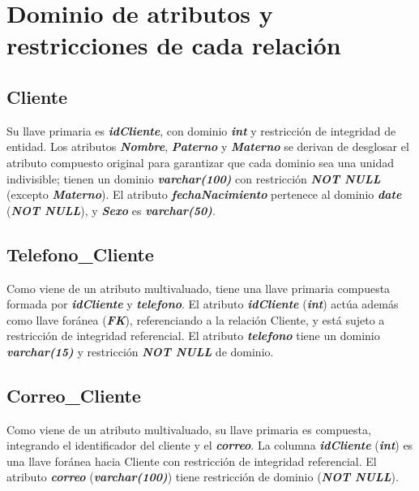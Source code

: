 \documentclass[11pt,letterpaper,spanish]{article}
\begin{document}
\section{Dominio de atributos y restricciones de cada relación}

\subsection{Cliente}
Su llave primaria es \textbf{\textit{idCliente}}, con dominio \textbf{\textit{int}} y restricción de integridad de entidad. Los atributos \textbf{\textit{Nombre}}, \textbf{\textit{Paterno}} y \textbf{\textit{Materno}} se derivan de desglosar el atributo compuesto original para garantizar que cada dominio sea una unidad indivisible; tienen un dominio \textbf{\textit{varchar(100)}} con restricción \textbf{\textit{NOT NULL}} (excepto \textbf{\textit{Materno}}). El atributo \textbf{\textit{fechaNacimiento}} pertenece al dominio \textbf{\textit{date}} (\textbf{\textit{NOT NULL}}), y \textbf{\textit{Sexo}} es \textbf{\textit{varchar(50)}}.

\subsection{Telefono\_Cliente}
Como viene de un atributo multivaluado, tiene una llave primaria compuesta formada por \textbf{\textit{idCliente}} y \textbf{\textit{telefono}}. El atributo \textbf{\textit{idCliente}} (\textbf{\textit{int}}) actúa además como llave foránea (\textbf{\textit{FK}}), referenciando a la relación Cliente, y está sujeto a restricción de integridad referencial. El atributo \textbf{\textit{telefono}} tiene un dominio \textbf{\textit{varchar(15)}} y restricción \textbf{\textit{NOT NULL}} de dominio.

\subsection{Correo\_Cliente}
Como viene de un atributo multivaluado, su llave primaria es compuesta, integrando el identificador del cliente y el \textbf{\textit{correo}}. La columna \textbf{\textit{idCliente}} (\textbf{\textit{int}}) es una llave foránea hacia Cliente con restricción de integridad referencial. El atributo \textbf{\textit{correo}} (\textbf{\textit{varchar(100)}}) tiene restricción de dominio (\textbf{\textit{NOT NULL}}).
\end{document}
